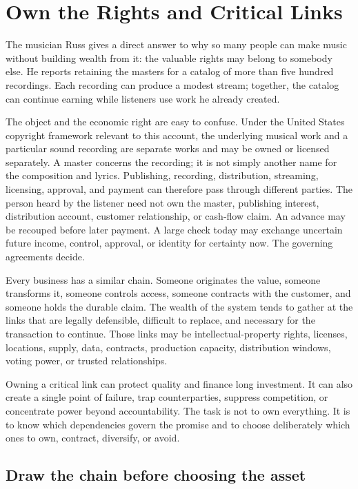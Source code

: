 \chapter{Own the Rights and Critical Links}

The musician Russ gives a direct answer to why so many people can make music
without building wealth from it: the valuable rights may belong to somebody
else. He reports retaining the masters for a catalog of more than five hundred
recordings. Each recording can produce a modest stream; together, the catalog
can continue earning while listeners use work he already created.

The object and the economic right are easy to confuse. Under the United States
copyright framework relevant to this account, the underlying musical work and
a particular sound recording are separate works and may be owned or licensed
separately. A master concerns the recording; it is not simply another name for
the composition and lyrics. Publishing, recording, distribution, streaming,
licensing, approval, and payment can therefore pass through different parties.
The person heard by the listener need not own the master, publishing interest,
distribution account, customer relationship, or cash-flow claim. An advance
may be recouped before later payment. A large check today may exchange
uncertain future income, control, approval, or identity for certainty now. The
governing agreements decide.

Every business has a similar chain. Someone originates the value, someone
transforms it, someone controls access, someone contracts with the customer,
and someone holds the durable claim. The wealth of the system tends to gather
at the links that are legally defensible, difficult to replace, and necessary
for the transaction to continue. Those links may be intellectual-property
rights, licenses, locations, supply, data, contracts, production capacity,
distribution windows, voting power, or trusted relationships.

Owning a critical link can protect quality and finance long investment. It can
also create a single point of failure, trap counterparties, suppress
competition, or concentrate power beyond accountability. The task is not to
own everything. It is to know which dependencies govern the promise and to
choose deliberately which ones to own, contract, diversify, or avoid.

\section{Draw the chain before choosing the asset}

